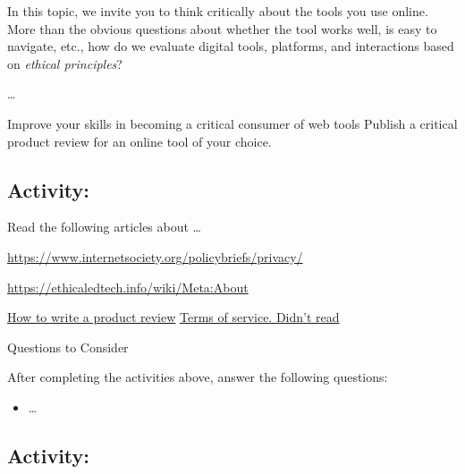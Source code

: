 \documentclass[
]{book}
\providecommand{\tightlist}{%
  \setlength{\itemsep}{0pt}\setlength{\parskip}{0pt}}
\theoremstyle{definition}
\theoremstyle{definition}
\theoremstyle{definition}
\theoremstyle{definition}
\theoremstyle{remark}
\begin{document}
In this topic, we invite you to think critically about the tools you use online. More than the obvious questions about whether the tool works well, is easy to navigate, etc., how do we evaluate digital tools, platforms, and interactions based on \emph{ethical principles}?

\ldots{}

Improve your skills in becoming a critical consumer of web tools
Publish a critical product review for an online tool of your choice.

\hypertarget{activity-8}{%
\subsection*{Activity:}\label{activity-8}}

\begin{reflect}
Read the following articles about \ldots{}

\url{https://www.internetsociety.org/policybriefs/privacy/}

\url{https://ethicaledtech.info/wiki/Meta:About}

\href{https://www.wikihow.com/Write-a-Product-Review}{How to write a product review}
\href{https://tosdr.org/}{Terms of service. Didn't read}

{Questions to Consider}

After completing the activities above, answer the following questions:

\begin{itemize}
\tightlist
\item
  \ldots{}
\end{itemize}
\end{reflect}

\hypertarget{activity-9}{%
\subsection*{Activity:}\label{activity-9}}
\end{document}
